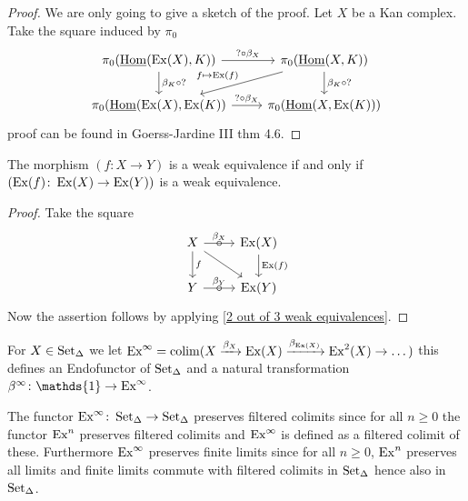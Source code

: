 \begin{proof}
    We are only going to give a sketch of the proof.
    Let $X$ be a Kan complex. 
    Take the square induced by $\pi_0$
    \[
    \begin{tikzcd}
        \pi_0(\underline{\Hom}(\Ex(X),K)) 
        \ar[d, "\beta_K \circ ?"]
        \ar[r, "? \circ \beta_X"]
        &
        \pi_0(\underline{\Hom}(X,K))
        \ar[d, "\beta_K \circ ?"]
        \ar[ld, "f\mapsto \Ex(f)"']
        \\
        \pi_0(\underline{\Hom}(\Ex(X),\Ex(K))
        \ar[r, "? \circ \beta_X"]
        &
        \pi_0(\underline{\Hom}(X, \Ex(K)))
    \end{tikzcd}
    \]
    proof can be found in Goerss-Jardine III thm 4.6.
\end{proof}

\begin{cor}
\label{Ex preserves and reflects weak eq.}
    The morphism $(f\colon X \to Y)$ is a weak equivalence if and only if
    $(\operatorname{Ex}(f)\colon \operatorname{Ex}(X) \to \operatorname{Ex}(Y))$ is a weak equivalence.
\end{cor}

\begin{proof}
    Take the square
    \[
    \begin{tikzcd}
        X
        \ar[r, "\circ" marking, "\beta_X"]
        \ar[d, "f"]
        \ar[dr]
        &
        \Ex(X)
        \ar[d, "\Ex(f)"]
        \\
        Y
        \ar[r, "\circ" marking, "\beta_Y"]
        &
        \Ex(Y)
    \end{tikzcd}
    \] 
    Now the assertion follows by applying \cref{2 out of 3 weak equivalences}.
\end{proof}

\begin{defi}
    For $X \in \operatorname{Set}_{\Delta}$ we let $\text{Ex}^\infty = \operatorname{colim} ( X \xrightarrow{\beta_X} \operatorname{Ex}(X) \xrightarrow{\beta_{\operatorname{Ex}(X)}}\operatorname{Ex}^2(X) \to \dotsc)$ this defines an Endofunctor of $\operatorname{Set}_{\Delta}$ and a natural transformation $\beta^{\infty}\colon \mathds{1} \to \Exinfty$.
\end{defi}

\begin{prop}
    The functor $\text{Ex}^\infty\colon \operatorname{Set}_{\Delta} \to \operatorname{Set}_{\Delta}$ preserves filtered colimits since for all $n\geq 0$ the functor $\operatorname{Ex}^n$ preserves filtered colimits and $\text{Ex}^\infty$ is defined as a filtered colimit of these.
    Furthermore $\text{Ex}^\infty$ preserves finite limits since for all $n \geq 0$, $\operatorname{Ex}^n$ preserves all limits and finite limits commute with filtered colimits in $\operatorname{Set}_{\Delta}$ hence also in $\operatorname{Set}_{\Delta}$.
\end{prop}


